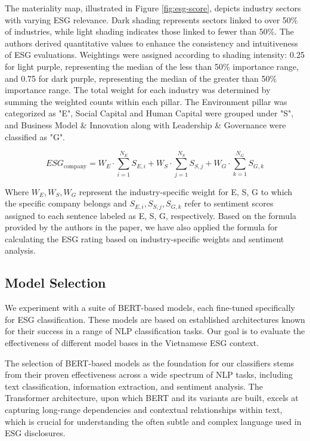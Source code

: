 \documentclass[12pt, letterpaper]{template}
\begin{document}
The materiality map, illustrated in Figure \ref{fig:esg-score}, depicts industry sectors with varying ESG relevance. Dark shading represents sectors linked to over 50\% of industries, while light shading indicates those linked to fewer than 50\%. The authors derived quantitative values to enhance the consistency and intuitiveness of ESG evaluations. Weightings were assigned according to shading intensity: 0.25 for light purple, representing the median of the less than 50\% importance range, and 0.75 for dark purple, representing the median of the greater than 50\% importance range. The total weight for each industry was determined by summing the weighted counts within each pillar. The Environment pillar was categorized as "E", Social Capital and Human Capital were grouped under "S", and Business Model \& Innovation along with Leadership \& Governance were classified as "G".

\begin{equation}
ESG_{\text{company}} =
W_E \cdot \sum_{i=1}^{N_E} S_{E,i}
+ W_S \cdot \sum_{j=1}^{N_S} S_{S,j}
+ W_G \cdot \sum_{k=1}^{N_G} S_{G,k}
\end{equation}

Where $W_E, W_S, W_G$ represent the industry-specific weight for E, S, G to which the specific company belongs and $S_{E,i}, S_{S,j}, S_{G,k}$ refer to sentiment scores assigned to each sentence labeled as E, S, G, respectively. Based on the formula provided by the authors in the paper, we have also applied the formula for calculating the ESG rating based on industry-specific weights and sentiment analysis.

\subsection{Model Selection} 

We experiment with a suite of BERT-based models, each fine-tuned specifically for ESG classification. These models are based on established architectures known for their success in a range of NLP classification tasks. Our goal is to evaluate the effectiveness of different model bases in the Vietnamese ESG context.

The selection of BERT-based models as the foundation for our classifiers stems from their proven effectiveness across a wide spectrum of NLP tasks, including text classification, information extraction, and sentiment analysis. The Transformer architecture, upon which BERT and its variants are built, excels at capturing long-range dependencies and contextual relationships within text, which is crucial for understanding the often subtle and complex language used in ESG disclosures. 
\end{document}
